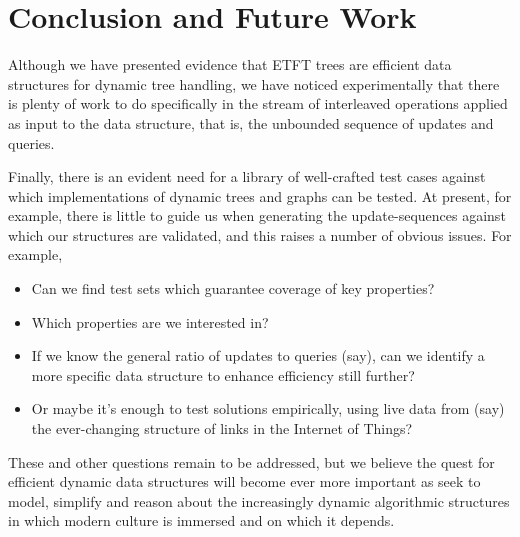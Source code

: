 \section{Conclusion and Future Work} 
\label{sec:Concl} 

Although we have presented evidence that ETFT trees are efficient data structures for dynamic tree handling, we have noticed experimentally that there is plenty of work to do specifically in the stream of interleaved operations applied as input to the data structure, that is, the unbounded sequence of updates and queries.

Finally, there is an evident need for a library of well-crafted test cases against which implementations of dynamic trees and graphs can be tested. At present, for example, there is little to guide us when generating the update-sequences against which our structures are validated, and this raises a number of obvious issues. For example,

\begin{itemize}
\item Can we find test sets which guarantee coverage of key properties?

\item Which properties are we interested in?

\item If we know the general ratio of updates to queries (say), can we identify a more specific data structure to enhance efficiency still further?

\item Or maybe it’s enough to test solutions empirically, using live data from (say) the ever-changing structure of links in the Internet of Things?

\end{itemize}

These and other questions remain to be addressed, but we believe the quest for efficient dynamic data structures will become ever more important as seek to model, simplify and reason about the increasingly dynamic algorithmic structures in which modern culture is immersed and on which it depends.



